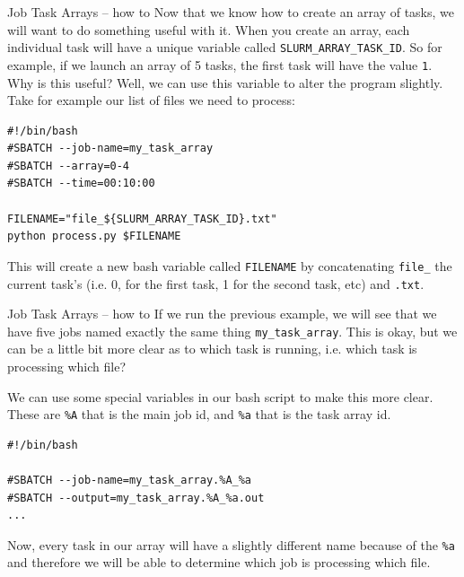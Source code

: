 \documentclass[10pt]{beamer}
\begin{document}
\begin{frame}[label={sec:org186cb14},fragile]{Job Task Arrays -- how to}
 Now that we know how to create an array of tasks, we will want to do something
useful with it. When you create an array, each individual task will have a
unique variable called \texttt{SLURM\_ARRAY\_TASK\_ID}. So for example, if we launch an
array of 5 tasks, the first task will have the value \texttt{1}. Why is this useful?
Well, we can use this variable to alter the program slightly. Take for example
our list of files we need to process:

\begin{verbatim}
#!/bin/bash
#SBATCH --job-name=my_task_array
#SBATCH --array=0-4
#SBATCH --time=00:10:00

FILENAME="file_${SLURM_ARRAY_TASK_ID}.txt"
python process.py $FILENAME
\end{verbatim}

This will create a new bash variable called \texttt{FILENAME} by concatenating \texttt{file\_} the
current task's (i.e. 0, for the first task, 1 for the second task, etc) and
\texttt{.txt}.
\end{frame}

\begin{frame}[label={sec:orgde3c182},fragile]{Job Task Arrays -- how to}
 If we run the previous example, we will see that we have five jobs named exactly
the same thing \texttt{my\_task\_array}. This is okay, but we can be a little bit more
clear as to which task is running, i.e. which task is processing which file?

We can use some special variables in our bash script to make this more
clear. These are \texttt{\%A} that is the main job id, and \texttt{\%a} that is the task array id.

\begin{verbatim}
#!/bin/bash

#SBATCH --job-name=my_task_array.%A_%a
#SBATCH --output=my_task_array.%A_%a.out
...
\end{verbatim}

Now, every task in our array will have a slightly different name because of the
\texttt{\%a} and therefore we will be able to determine which job is processing which
file.
\end{frame}
\end{document}
